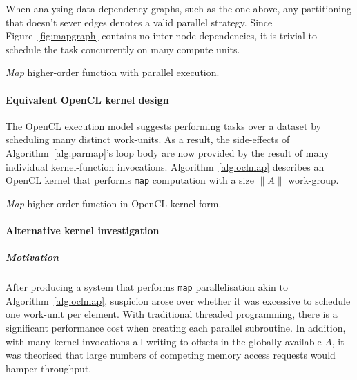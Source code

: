 When analysing data-dependency graphs, such as the one above, any partitioning that doesn't sever edges denotes a valid parallel strategy. Since Figure~\ref{fig:mapgraph} contains no inter-node dependencies, it is trivial to schedule the task concurrently on many compute units.

\begin{algorithm}
  \caption{\emph{Map} higher-order function with parallel execution.}
  \label{alg:parmap}

  \begin{algorithmic}
      \EndPFor
    \EndFunction
  \end{algorithmic}
\end{algorithm}

\paragraph*{Equivalent \ac{OpenCL} kernel design}
The \ac{OpenCL} execution model suggests performing tasks over a dataset by scheduling many distinct work-units. As a result, the side-effects of Algorithm~\ref{alg:parmap}'s loop body are now provided by the result of many individual kernel-function invocations. Algorithm~\ref{alg:oclmap} describes an \ac{OpenCL} kernel that performs \verb|map| computation with a size $\|A\|$ work-group.

\begin{algorithm}
  \caption{\emph{Map} higher-order function in OpenCL kernel form.}
  \label{alg:oclmap}

  \begin{algorithmic}

    \EndFunction
  \end{algorithmic}
\end{algorithm}

\paragraph*{Alternative kernel investigation}
\subparagraph*{Motivation}
After producing a system that performs \verb|map| parallelisation akin to Algorithm~\ref{alg:oclmap}, suspicion arose over whether it was excessive to schedule one work-unit per element. With traditional threaded programming, there is a significant performance cost when creating each parallel subroutine. In addition, with many kernel invocations all writing to offsets in the globally-available $A$, it was theorised that large numbers of competing memory access requests would hamper throughput.

